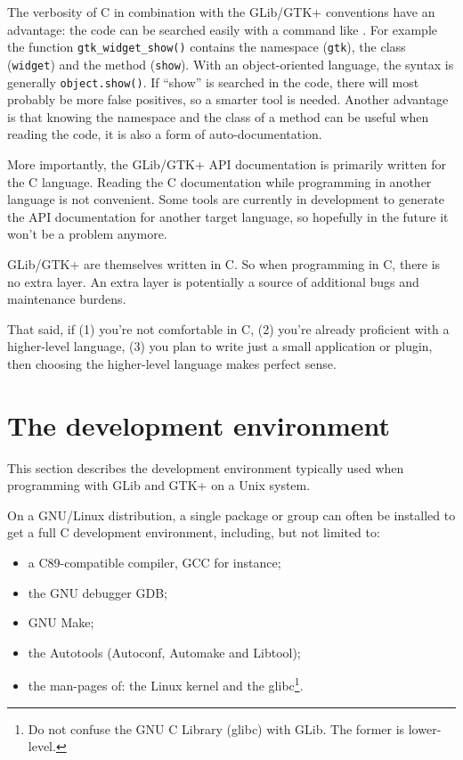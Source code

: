 The verbosity of C in combination with the GLib/GTK+ conventions have an advantage: the code can be searched easily with a command like . For example the function \lstinline{gtk_widget_show()} contains the namespace (\lstinline{gtk}), the class (\lstinline{widget}) and the method (\lstinline{show}). With an object-oriented language, the syntax is generally \lstinline{object.show()}. If ``show'' is searched in the code, there will most probably be more false positives, so a smarter tool is needed. Another advantage is that knowing the namespace and the class of a method can be useful when reading the code, it is also a form of auto-documentation.

More importantly, the GLib/GTK+ API documentation is primarily written for the C language. Reading the C documentation while programming in another language is not convenient. Some tools are currently in development to generate the API documentation for another target language, so hopefully in the future it won't be a problem anymore.

GLib/GTK+ are themselves written in C. So when programming in C, there is no extra layer. An extra layer is potentially a source of additional bugs and maintenance burdens.

That said, if (1) you're not comfortable in C, (2) you're already proficient with a higher-level language, (3) you plan to write just a small application or plugin, then choosing the higher-level language makes perfect sense.

\section{The development environment}

This section describes the development environment typically used when programming with GLib and GTK+ on a Unix system.

On a GNU/Linux distribution, a single package or group can often be installed to get a full C development environment, including, but not limited to:
\begin{itemize}
  \item a C89-compatible compiler, GCC for instance;
  \item the GNU debugger GDB;
  \item GNU Make;
  \item the Autotools (Autoconf, Automake and Libtool);
  \item the man-pages of: the Linux kernel and the glibc\footnote{Do not confuse the GNU C Library (glibc) with GLib. The former is lower-level.}.
\end{itemize}

